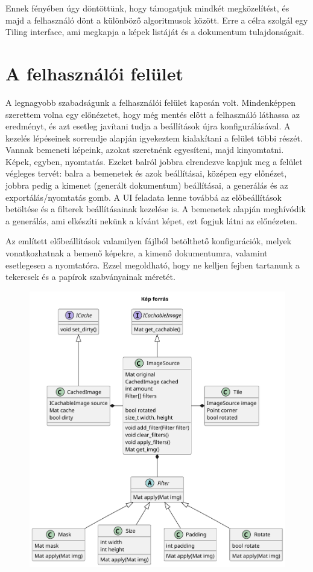 Ennek fényében úgy döntöttünk, hogy támogatjuk mindkét megközelítést, és majd a felhasználó dönt a különböző algoritmusok között. Erre a célra szolgál egy Tiling interface, ami megkapja a képek listáját és a dokumentum tulajdonságait.

\section{A felhasználói felület}

A legnagyobb szabadságunk a felhasználói felület kapcsán volt. Mindenképpen szerettem volna egy előnézetet, hogy még mentés előtt a felhasználó láthassa az eredményt, és azt esetleg javítani tudja a beállítások újra konfigurálásával. A kezelés lépéseinek sorrendje alapján igyekeztem kialakítani a felület többi részét. Vannak bemeneti képeink, azokat szeretnénk egyesíteni, majd kinyomtatni. Képek, egyben, nyomtatás. Ezeket balról jobbra elrendezve kapjuk meg a felület végleges tervét: balra a bemenetek és azok beállításai, középen egy előnézet, jobbra pedig a kimenet (generált dokumentum) beállításai, a generálás és az exportálás/nyomtatás gomb. A UI feladata lenne továbbá az előbeállítások betöltése és a filterek beállításainak kezelése is. A bemenetek alapján meghívódik a generálás, ami elkészíti nekünk a kívánt képet, ezt fogjuk látni az előnézeten.

Az említett előbeállítások valamilyen fájlból betölthető konfigurációk, melyek vonatkozhatnak a bemenő képekre, a kimenő dokumentumra, valamint esetlegesen a nyomtatóra. Ezzel megoldható, hogy ne kelljen fejben tartanunk a tekercsek és a papírok szabványainak méretét.


\begin{figure}
    \centering
    \includegraphics[width=15cm]{figures/uml/img_source.pdf}
    \label{fig:ImageSource_uml}
\end{figure}

